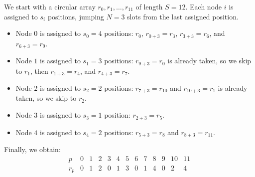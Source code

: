 We start with a circular array $r_0, r_1, \dots, r_{11}$ of length $S = 12$.
Each node $i$ is assigned to $s_i$ positions, jumping $N = 3$ slots from the
last assigned position.

\begin{itemize}
    \item Node $0$ is assigned to $s_0 = 4$ positions: $r_0$, $r_{0+3} = r_3$,
        $r_{3+3} = r_6$, and $r_{6+3} = r_9$.
    \item Node $1$ is assigned to $s_1 = 3$ positions: $r_{9+3} = r_{0}$ is
        already taken, so we skip to $r_1$, then $r_{1+3} = r_4$, and
        $r_{4+3} = r_7$.
    \item Node $2$ is assigned to $s_2 = 2$ positions: $r_{7+3} = r_{10}$ and
        $r_{10+3} = r_1$ is already taken, so we skip to $r_2$.
    \item Node $3$ is assigned to $s_3 = 1$ position: $r_{2+3} = r_5$.
    \item Node $4$ is assigned to $s_4 = 2$ positions: $r_{5+3} = r_8$ and
        $r_{8+3} = r_{11}$.
\end{itemize}


Finally, we obtain:
\[
    \begin{array}{c|cccccccccccc}
        p   & 0 & 1 & 2 & 3 & 4 & 5 & 6 & 7 & 8 & 9 & 10 & 11 \\ \hline
        r_p & 0 & 1 & 2 & 0 & 1 & 3 & 0 & 1 & 4 & 0 & 2  & 4
    \end{array}
\]

